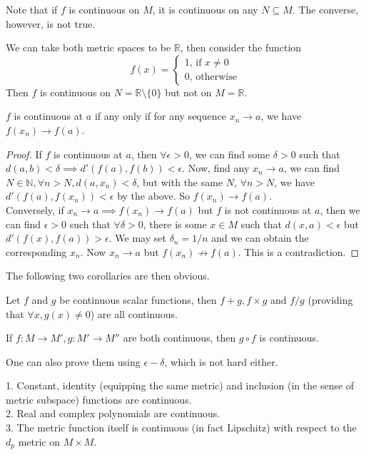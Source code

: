 Note that if $f$ is continuous on $M$, it is continuous on any $N\subseteq M$.
The converse, however, is not true.
\begin{example}
    We can take both metric spaces to be $\mathbb R$, then consider the function
    $$f(x)=\begin{cases}
        1\text{, if $x\neq 0$}\\
        0\text{, otherwise}
    \end{cases}$$
    Then $f$ is continuous on $N=\mathbb R\setminus\{0\}$ but not on $M=\mathbb R$.
\end{example}
\begin{proposition}
    $f$ is continuous at $a$ if any only if for any sequence $x_n\to a$, we have $f(x_n)\to f(a)$.
\end{proposition}
\begin{proof}
    If $f$ is continuous at $a$, then $\forall\epsilon>0$, we can find some $\delta>0$ such that $d(a,b)<\delta\implies d'(f(a),f(b))<\epsilon$.
    Now, find any $x_n\to a$, we can find $N\in\mathbb N, \forall n>N, d(a,x_n)<\delta$, but with the same $N$, $\forall n>N$, we have $d'(f(a),f(x_n))<\epsilon$ by the above.
    So $f(x_n)\to f(a)$.\\
    Conversely, if $x_n\to a\implies f(x_n)\to f(a)$ but $f$ is not continuous at $a$, then we can find $\epsilon>0$ such that $\forall\delta>0$, there is some $x\in M$ such that $d(x,a)<\epsilon$ but $d'(f(x),f(a))>\epsilon$.
    We may set $\delta_n=1/n$ and we can obtain the corresponding $x_n$.
    Now $x_n\to a$ but $f(x_n)\not\to f(a)$.
    This is a contradiction.
\end{proof}
The following two corollaries are then obvious.
\begin{corollary}
    Let $f$ and $g$ be continuous scalar functions, then $f+g, f\times g$ and $f/g$ (providing that $\forall x,g(x)\neq 0$) are all continuous.
\end{corollary}
\begin{corollary}
    If $f:M\to M',g:M'\to M''$ are both continuous, then $g\circ f$ is continuous.
\end{corollary}
One can also prove them using $\epsilon-\delta$, which is not hard either.
\begin{example}
    1. Constant, identity (equipping the same metric) and inclusion (in the sense of metric subspace) functions are continuous.\\
    2. Real and complex polynomials are continuous.\\
    3. The metric function itself is continuous (in fact Lipschitz) with respect to the $d_p$ metric on $M\times M$.
\end{example}
